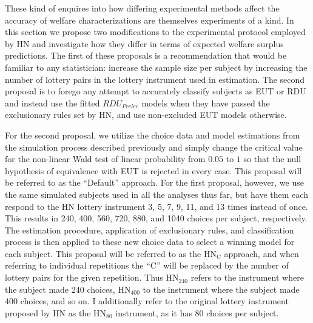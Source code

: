 \documentclass[../main.tex]{subfiles}
\begin{document}
These kind of enquires into how differing experimental methods affect the accuracy of welfare characterizations are themselves experiments of a kind.
In this section we propose two modifications to the experimental protocol employed by HN and investigate how they differ in terms of expected welfare surplus predictions.
The first of these proposals is a recommendation that would be familiar to any statistician: increase the sample size per subject by increasing the number of lottery pairs in the lottery instrument used in estimation.
The second proposal is to forego any attempt to accurately classify subjects as EUT or RDU and instead use the fitted $\mathit{RDU_{Prelec}}$ models when they have passed the exclusionary rules set by HN, and use non-excluded EUT models otherwise.

For the second proposal, we utilize the choice data and model estimations from the simulation process described previously and simply change the critical value for the non-linear Wald test of linear probability from $0.05$ to $1$ so that the null hypothesis of equivalence with EUT is rejected in every case.
This proposal will be referred to as the \enquote{Default} approach.
For the first proposal, however, we use the same simulated subjects used in all the analyses thus far, but have them each respond to the HN lottery instrument 3, 5, 7, 9, 11, and 13 times instead of once.
This results in 240, 400, 560, 720, 880, and 1040 choices per subject, respectively.
The estimation procedure, application of exclusionary rules, and classification process is then applied to these new choice data to select a winning model for each subject.
This proposal will be referred to as the $\text{HN}_\text{C}$ approach, and when referring to individual repetitions the \enquote{C} will be replaced by the number of lottery pairs for the given repetition.
Thus $\text{HN}_{240}$ refers to the instrument where the subject made 240 choices, $\text{HN}_{400}$ to the instrument where the subject made 400 choices, and so on.
I additionally refer to the original lottery instrument proposed by HN as the $\text{HN}_{80}$ instrument, as it has 80 choices per subject.
\end{document}
